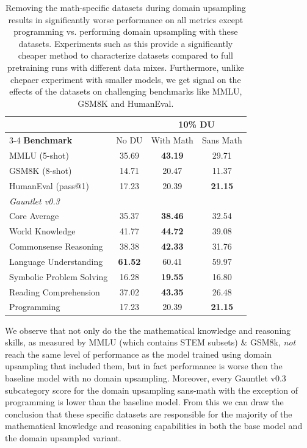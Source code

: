 \documentclass[10pt]{article} %
\begin{document}
\begin{table}[!h]
    \centering
    \begin{tabular}{l c c c} \toprule 
         & &  \multicolumn{2}{c}{10\% DU} \\
         \cmidrule(lr){3-4}
         \textbf{Benchmark}  & No DU & With Math & Sans Math   \\ \midrule 
         MMLU (5-shot)  & 35.69 & {\bf \color{c2} 43.19} & 29.71 \\
         GSM8K (8-shot) & 14.71 & 20.47 & 11.37  \\
         HumanEval (pass@1) & 17.23 & 20.39 & {\bf \color{c2} 21.15} \\
         \midrule
         \textit{Gauntlet v0.3} \\
         \quad Core Average &  35.37 & {\bf \color{c2} 38.46} & 32.54            \\
         \quad World Knowledge          & 41.77 & {\bf \color{c2} 44.72} & 39.08 \\
         \quad Commonsense Reasoning    & 38.38 & {\bf \color{c2} 42.33} & 31.76   \\
         \quad Language Understanding   & {\bf \color{c2} 61.52} & 60.41 & 59.97  \\
         \quad Symbolic Problem Solving & 16.28 & {\bf \color{c2} 19.55} & 16.80  \\
         \quad Reading Comprehension    & 37.02 & {\bf \color{c2} 43.35} & 26.48   \\
         \quad Programming & 17.23 & 20.39 & {\bf \color{c2} 21.15} \\
         \bottomrule
    \end{tabular}
    \caption{Removing the math-specific datasets during domain upsampling results in significantly worse performance on all metrics except programming vs. performing domain upsampling with these datasets.  Experiments such as this provide a significantly cheaper method to characterize datasets compared to full pretraining runs with different data mixes.  Furthermore, unlike chepaer experiment with smaller models, we get signal on the effects of the datasets on challenging benchmarks like MMLU, GSM8K and HumanEval.}
    \label{tab:cl-model-eval3}
\end{table}

We observe that not only do the the mathematical knowledge and reasoning skills, as measured by MMLU (which contains STEM subsets) \& GSM8k, \textit{not} reach the same level of performance as the model trained using domain upsampling that included them, but in fact performance is worse then the baseline model with no domain upsampling. Moreover, every Gauntlet v0.3 subcategory score for the domain upsampling sans-math with the exception of programming is lower than the baseline model. From this we can draw the conclusion that these specific datasets are responsible for the majority of the mathematical knowledge and reasoning capabilities in both the base model and the domain upsampled variant.
\end{document}
